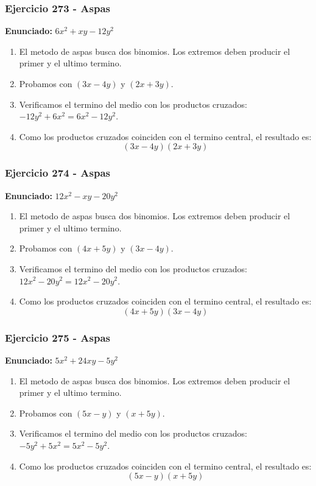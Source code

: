 \documentclass[11pt,a4paper]{article}
\begin{document}
\vspace{0.2cm}
\subsubsection*{Ejercicio 273 - Aspas}
\textbf{Enunciado:} $ 6 x^{2} + x y - 12 y^{2} $\par
\begin{enumerate}[leftmargin=2em]
\item El metodo de aspas busca dos binomios. Los extremos deben producir el primer y el ultimo termino.
\item Probamos con \((3 x - 4 y)\) y \((2 x + 3 y)\).
\item Verificamos el termino del medio con los productos cruzados: \(- 12 y^{2}+6 x^{2}=6 x^{2} - 12 y^{2}\).
\item Como los productos cruzados coinciden con el termino central, el resultado es: \[\boxed{\left(3 x - 4 y\right)\left(2 x + 3 y\right)}\]
\end{enumerate}

\vspace{0.2cm}
\subsubsection*{Ejercicio 274 - Aspas}
\textbf{Enunciado:} $ 12 x^{2} - x y - 20 y^{2} $\par
\begin{enumerate}[leftmargin=2em]
\item El metodo de aspas busca dos binomios. Los extremos deben producir el primer y el ultimo termino.
\item Probamos con \((4 x + 5 y)\) y \((3 x - 4 y)\).
\item Verificamos el termino del medio con los productos cruzados: \(12 x^{2}- 20 y^{2}=12 x^{2} - 20 y^{2}\).
\item Como los productos cruzados coinciden con el termino central, el resultado es: \[\boxed{\left(4 x + 5 y\right)\left(3 x - 4 y\right)}\]
\end{enumerate}

\vspace{0.2cm}
\subsubsection*{Ejercicio 275 - Aspas}
\textbf{Enunciado:} $ 5 x^{2} + 24 x y - 5 y^{2} $\par
\begin{enumerate}[leftmargin=2em]
\item El metodo de aspas busca dos binomios. Los extremos deben producir el primer y el ultimo termino.
\item Probamos con \((5 x - y)\) y \((x + 5 y)\).
\item Verificamos el termino del medio con los productos cruzados: \(- 5 y^{2}+5 x^{2}=5 x^{2} - 5 y^{2}\).
\item Como los productos cruzados coinciden con el termino central, el resultado es: \[\boxed{\left(5 x - y\right)\left(x + 5 y\right)}\]
\end{enumerate}
\end{document}
